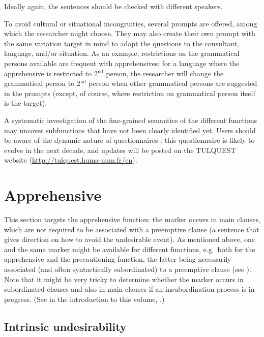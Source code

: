 \documentclass[output=paper,colorlinks,citecolor=brown]{langscibook}
\begin{document}
\noindent Ideally again, the sentences should be checked with different speakers.

To avoid cultural or situational incongruities, several prompts are offered, among which the researcher might choose. They may also create their own prompt with the same variation target in mind to adapt the questions to the consultant, language, and/or situation. As an example, restrictions on the grammatical persons available are frequent with apprehensives: for a language where the apprehensive is restricted to 2$\mathrm{^{nd}}$ person, the researcher will change the grammatical person to 2$\mathrm{^{nd}}$ person when other grammatical persons are suggested in the prompts (except, of course, where restriction on grammatical person itself is the target).

A systematic investigation of the fine-grained semantics of the different functions may uncover subfunctions that have not been clearly identified yet. Users should be aware of the dynamic nature of questionnaires \citep{Lahaussois2019}: this questionnaire is likely to evolve in the next decade, and updates will be posted on the TULQUEST website (\url{http://tulquest.huma-num.fr/en}). 


\section{Apprehensive}
\label{sec:apprehensive}

This section targets the apprehensive function: the marker occurs in main clauses, which are not required to be associated with a preemptive clause (a sentence that gives direction on how to avoid the undesirable event). As mentioned above, one and the same marker might be available for different functions, e.g.\ both for the apprehensive and the precautioning function, the latter being necessarily associated (and often syntactically subordinated) to a preemptive clause (see ). Note that it might be very tricky to determine whether the marker occurs in subordinated clauses and also in main clauses if an insubordination process is in progress. (See  in the introduction to this volume, \citealt{chapters/introduction}.)


\subsection{Intrinsic undesirability}
\label{subsec:apprintrinsic}
\end{document}
